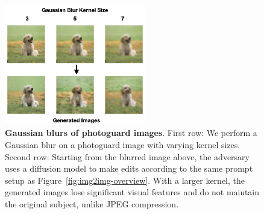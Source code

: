 \begin{figure}[ht]
\begin{center}
\includegraphics[width=0.55\textwidth]{images/flip-and-blur-figures.002.png}
\end{center}
\caption{\textbf{Gaussian blurs of photoguard images}. First row: We perform a Gaussian blur on a photoguard image with varying kernel sizes. Second row: Starting from the blurred image above, the adversary uses a diffusion model to make edits according to the same prompt setup as Figure~\ref{fig:img2img-overview}. With a larger kernel, the generated images lose significant visual features and do not maintain the original subject, unlike JPEG compression.}
\label{figure-gaussian-blur}
\end{figure}